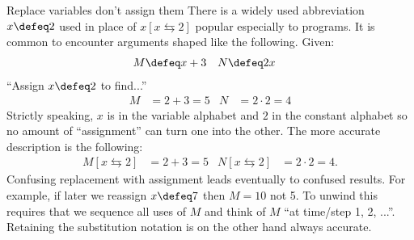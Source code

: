 \begin{remark}{Replace variables don't assign them}
    There is a widely used abbreviation $x\defeq 2$ used 
    in place of $x[x\leftrightarrows 2]$ popular especially to programs.  
    It is common to encounter arguments shaped like the following.  Given:
    \begin{align*}
        M & \defeq x+3 & N & \defeq 2x
    \end{align*}
    ``Assign $x \defeq 2$ to find...''
    \begin{align*}
        M  & = 2+3 =5 & N & = 2\cdot 2 =4
    \end{align*}
    Strictly speaking, $x$ is in the variable alphabet and $2$ in the constant 
    alphabet so no amount of ``assignment'' can turn one into the other.
    The more accurate description is the following:
    \begin{align*}
        M[x\leftrightarrows 2] & = 2+3=5 & N[x\leftrightarrows 2] & = 2\cdot 2=4.
    \end{align*}
    Confusing replacement with assignment leads eventually to confused 
    results.  For example, if later we reassign $x\defeq 7$ then $M=10$ not 5.
    To unwind this requires that we sequence all uses of $M$ and think of $M$ 
    ``at time/step 1, 2, ...''.  Retaining the substitution notation is 
    on the other hand always accurate.
\end{remark}







